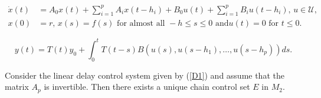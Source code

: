\documentclass[10pt,a4paper]{amsart}
\begin{document}
\begin{align}
\dot{x}(t)  &  =A_{0}x(t)+\sum_{i=1}^{p}A_{i}x(t-h_{i})+B_{0}u(t)+\sum
_{i=1}^{p}B_{i}u(t-h_{i}),\,u\in\mathcal{U},\label{D1}\\
x(0)  &  =r,\,x(s)=f(s)\text{ for almost all }-h\leq s\leq0\text{ and
}u(t)=0\text{ for }t\leq0.\nonumber
\end{align}

\begin{equation}
y(t)=T(t)y_{0}+\int_{0}^{t}T(t-s)B\left(  u(s),u(s-h_{1}),\ldots
,u(s-h_{p})\right)  ds. \label{mild}%
\end{equation}

\begin{theorem}
\label{Theorem_ccs1}Consider the linear delay control system given by
(\ref{D1}) and assume that the matrix $A_{p}$ is invertible. Then there exists
a unique chain control set $E$ in $M_{2}$.
\end{theorem}
\end{document}
